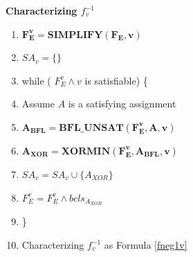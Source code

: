 \documentclass[journal]{IEEEtran}
\begin{document}
\vspace{0.2cm}

\begin{algo}\label{buildfdec_frm}
\textbf{Characterizing $f^{-1}_v$}
\begin{enumerate}%
\item \hspace{0.3cm} $\boldsymbol{F_E^v= SIMPLIFY(F_E,v)}$
\item \hspace{0.3cm} $SA_v= \{\}$
\item \hspace{0.3cm} while ( $F_E^v\wedge v$ is satisfiable) \{
\item \hspace{0.6cm} Assume $A$ is a satisfying assignment
\item \hspace{0.6cm} $\boldsymbol{A_{BFL}= BFL\_UNSAT(F_E^v,A,v)}$
\item \hspace{0.6cm} $\boldsymbol{A_{XOR}= XORMIN(F_E^v, A_{BFL},v)}$
\item \hspace{0.6cm} $SA_v= SA_v \cup \{ A_{XOR} \}$
\item \hspace{0.6cm} $F_E^v= F_E^v\wedge bcls_{A_{XOR}}$
\item \hspace{0.3cm} \}
\item \hspace{0.3cm} Characterizing $f^{-1}_v$ as Formula \ref{fneg1v}
\end{enumerate}
\end{algo}
\end{document}
